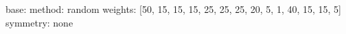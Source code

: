 base:
  method: random
  weights: [50, 15, 15, 15, 25, 25, 25, 20, 5, 1, 40, 15, 15, 5]
  symmetry: none